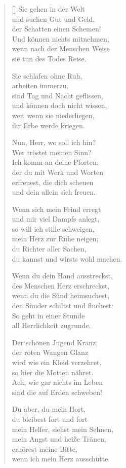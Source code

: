 \begin{multicols}{2}
\begin{verse}[\versewidth]
 Sie gehen in der Welt\\
und suchen Gut und Geld,\\
der Schatten einen Schemen!\\
Und können nichts mitnehmen,\\
wenn nach der Menschen Weise\\
sie tun des Todes Reise.

 Sie schlafen ohne Ruh,\\
arbeiten immerzu,\\
sind Tag und Nacht geflissen,\\
und können doch nicht wissen,\\
wer, wenn sie niederliegen,\\
ihr Erbe werde kriegen.

 Nun, Herr, wo soll ich hin?\\
Wer tröstet meinen Sinn?\\
Ich komm an deine Pforten,\\
der du mit Werk und Worten\\
erfreuest, die dich scheuen\\
und dein allein sich freuen.

 Wenn sich mein Feind erregt\\
und mir viel Dampfs anlegt,\\
so will ich stille schweigen,\\
mein Herz zur Ruhe neigen;\\
du Richter aller Sachen,\\
du kannst und wirsts wohl machen.

 Wenn du dein Hand ausstreckst,\\
des Menschen Herz erschreckst,\\
wenn du die Sünd heimsuchest,\\
den Sünder schiltst und fluchest:\\
So geht in einer Stunde\\
all Herrlichkeit zugrunde.

 Der schönen Jugend Kranz,\\
der roten Wangen Glanz\\
wird wie ein Kleid verzehret,\\
so hier die Motten nähret.\\
Ach, wie gar nichts im Leben\\
sind die auf Erden schweben!

 Du aber, du mein Hort,\\
du bleibest fort und fort\\
mein Helfer, siehst mein Sehnen,\\
mein Angst und heiße Tränen,\\
erhörest meine Bitte,\\
wenn ich mein Herz ausschütte.


\end{verse}
\end{multicols}
